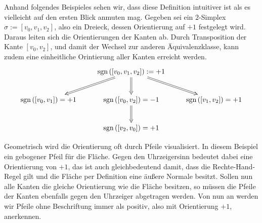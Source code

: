     \begin{beispiel}
      \label{bspOrientierung}
      Anhand folgendes Beispieles sehen wir, dass diese Definition intuitiver ist als es vielleicht auf den ersten Blick anmuten mag.
      Gegeben sei ein \( 2 \)-Simplex \( \sigma:=\left[ v_{0}, v_{1}, v_{2} \right] \), also ein Dreieck, dessen Orientierung auf \( +1 \) festgelegt wird.
      Daraus leiten sich die Orientierungen der Kanten ab. 
      Durch Transposition der Kante \( \left[ v_{0}, v_{2} \right] \), und damit der Wechsel zur anderen Äquivalenzklasse, kann zudem eine einheitliche Orintierung aller Kanten erreicht werden.
      \begin{align}
        \begin{xy}
          \xymatrix{
            & \sgn\left( \left[ v_{0}, v_{1}, v_{2} \right] \right):=+1 \ar@{=>}[ld] \ar@{=>}[d] \ar@{=>}[rd]& \\
            \sgn\left( \left[ v_{0}, v_{1} \right] \right)=+1 &
            \sgn\left( \left[ v_{0}, v_{2} \right] \right)=-1 \ar@{=>}[d] &
            \sgn\left( \left[ v_{1}, v_{2} \right] \right)=+1 \\
            & \sgn\left( \left[ v_{2}, v_{0} \right] \right)=+1 &
          }
        \end{xy}
      \end{align}
      \begin{minipage}{0.65\textwidth}
        Geometrisch wird die Orientierung oft durch Pfeile visualisiert.
        In diesem Beispiel ein gebogener Pfeil für die Fläche.
        Gegen den Uhrzeigersinn bedeutet dabei eine Orientierung von \( +1 \), das ist auch gleichbedeutend damit, 
        dass die Rechte-Hand-Regel 
        gilt und die Fläche per Definition eine äußere Normale besitzt.
        Sollen nun alle Kanten die gleiche Orientierung wie die Fläche besitzen, so müssen die Pfeile der Kanten ebenfalls gegen den Uhrzeiger abgetragen werden.
        Von nun an werden wir Pfeile ohne Beschriftung immer als positiv, also mit Orientierung \( +1 \), anerkennen.
      \end{minipage}
      \hfill
      \begin{minipage}{0.3\textwidth}  
\end{minipage}
\end{beispiel}
